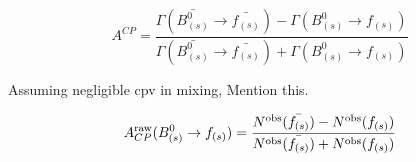 \begin{equation}
A^{CP} = \frac{\Gamma(\bar{B^0_{(s)}} \to \bar{f_{(s)}})-\Gamma(B^0_{(s)} \to f_{(s)})}{\Gamma(\bar{B^0_{(s)}} \to \bar{f_{(s)}})+ \Gamma(B^0_{(s)} \to f_{(s)})}
\end{equation}

{\color{red} Assuming negligible cpv in mixing, Mention this.}

\begin{equation}
A_{CP}^{\rm raw}(B^0_{(s)} \to f_{(s)}) = \frac{N^{\rm obs}(\bar{f_{(s)}}) -N^{\rm obs}(f_{(s)}) }{
N^{\rm obs}(\bar{f_{(s)}}) + N^{\rm obs}(f_{(s)})}
\label{acp_mes}
\end{equation}
